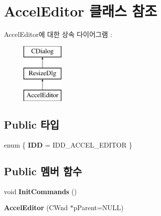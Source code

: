\hypertarget{class_accel_editor}{}\section{Accel\+Editor 클래스 참조}
\label{class_accel_editor}
Accel\+Editor에 대한 상속 다이어그램 \+: \begin{figure}[H]
\begin{center}
\leavevmode
\includegraphics[height=3.000000cm]{class_accel_editor}
\end{center}
\end{figure}
\subsection*{Public 타입}
\begin{DoxyCompactItemize}
\item 
\mbox{\label{class_accel_editor_a2c120196c6edcc4e45a1eb6321060cf7}} 
enum \{ {\bfseries I\+DD} = I\+D\+D\+\_\+\+A\+C\+C\+E\+L\+\_\+\+E\+D\+I\+T\+OR
 \}
\end{DoxyCompactItemize}
\subsection*{Public 멤버 함수}
\begin{DoxyCompactItemize}
\item 
\mbox{\label{class_accel_editor_a3c882fb85c72711e26cfe800fb11ccfa}} 
void {\bfseries Init\+Commands} ()
\item 
\mbox{\label{class_accel_editor_a4f3eb3bfb01a597da630a3144687f1ec}} 
{\bfseries Accel\+Editor} (C\+Wnd $\ast$p\+Parent=N\+U\+LL)
\end{DoxyCompactItemize}
